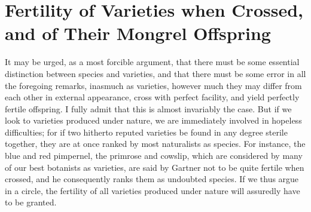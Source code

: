 \section{Fertility of Varieties when Crossed, and of Their Mongrel Offspring}
It may be urged, as a most forcible argument, that there must be some essential distinction between species and varieties, and that there must be some error in all the foregoing remarks, inasmuch as varieties, however much they may differ from each other in external appearance, cross with perfect facility, and yield perfectly fertile offspring. I fully admit that this is almost invariably the case. But if we look to varieties produced under nature, we are immediately involved in hopeless difficulties; for if two hitherto reputed varieties be found in any degree sterile together, they are at once ranked by most naturalists as species. For instance, the blue and red pimpernel, the primrose and cowslip, which are considered by many of our best botanists as varieties, are said by Gartner not to be quite fertile when crossed, and he consequently ranks them as undoubted species. If we thus argue in a circle, the fertility of all varieties produced under nature will assuredly have to be granted.
